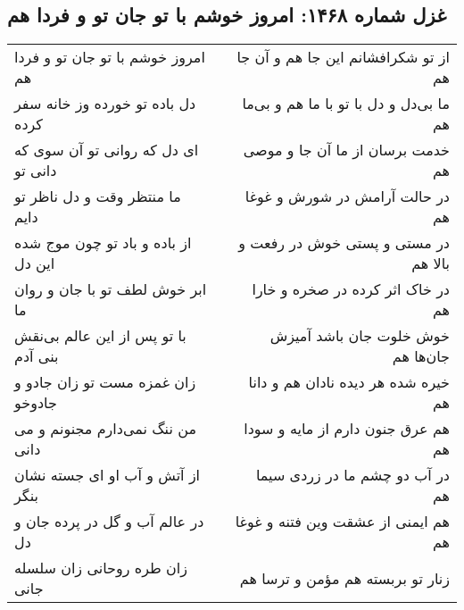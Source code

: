 \begin{center}
\section*{غزل شماره ۱۴۶۸: امروز خوشم با تو جان تو و فردا هم}
\label{sec:1468}
\begin{longtable}{l p{0.5cm} r}
امروز خوشم با تو جان تو و فردا هم
&&
از تو شکرافشانم این جا هم و آن جا هم
\\
دل باده تو خورده وز خانه سفر کرده
&&
ما بی‌دل و دل با تو با ما هم و بی‌ما هم
\\
ای دل که روانی تو آن سوی که دانی تو
&&
خدمت برسان از ما آن جا و موصی هم
\\
ما منتظر وقت و دل ناظر تو دایم
&&
در حالت آرامش در شورش و غوغا هم
\\
از باده و باد تو چون موج شده این دل
&&
در مستی و پستی خوش در رفعت و بالا هم
\\
ابر خوش لطف تو با جان و روان ما
&&
در خاک اثر کرده در صخره و خارا هم
\\
با تو پس از این عالم بی‌نقش بنی آدم
&&
خوش خلوت جان باشد آمیزش جان‌ها هم
\\
زان غمزه مست تو زان جادو و جادوخو
&&
خیره شده هر دیده نادان هم و دانا هم
\\
من ننگ نمی‌دارم مجنونم و می دانی
&&
هم عرق جنون دارم از مایه و سودا هم
\\
از آتش و آب او ای جسته نشان بنگر
&&
در آب دو چشم ما در زردی سیما هم
\\
در عالم آب و گل در پرده جان و دل
&&
هم ایمنی از عشقت وین فتنه و غوغا هم
\\
زان طره روحانی زان سلسله جانی
&&
زنار تو بربسته هم مؤمن و ترسا هم
\\
\end{longtable}
\end{center}
